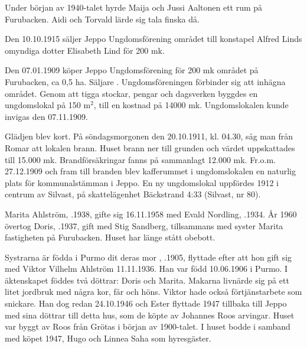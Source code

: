Under början av 1940-talet hyrde Maija och Jussi Aaltonen ett rum på Furubacken. Aidi och Torvald lärde sig tala finska då.



Den 10.10.1915 säljer Jeppo Ungdomsförening området till konstapel Alfred Linds omyndiga dotter  Elisabeth Lind för 200 mk.


Den 07.01.1909 köper Jeppo Ungdomsförening för 200 mk området på Furubacken, ca 0,5 ha. Säljare . Ungdomsföreningen förbinder sig att inhägna området. Genom att tigga stockar, pengar och dagsverken byggdes en ungdomslokal på 150 m$^2$, till en kostnad på 14000 mk. Ungdomslokalen kunde invigas den 07.11.1909.

Glädjen blev kort. På söndagsmorgonen den 20.10.1911, kl. 04.30, såg man från Romar att lokalen brann. Huset brann ner till grunden och värdet uppskattades till 15.000 mk. Brandförsäkringar fanns på sammanlagt 12.000 mk. Fr.o.m. 27.12.1909 och fram till branden blev kafferummet i ungdomslokalen en naturlig plats för kommunalstämman i Jeppo. En ny ungdomslokal uppfördes 1912 i centrum av Silvast, på skattelägenhet Bäckstrand 4:33 (Silvast, nr 80).





Marita Ahlström, .1938, gifte sig 16.11.1958 med Evald Nordling, .1934. År 1960 övertog Doris, .1937, gift med Stig Sandberg, tillsammans med syster Marita fastigheten på Furubacken. Huset har länge stått obebott.

Systrarna är födda i Purmo dit deras mor , .1905, flyttade efter att hon gift sig med Viktor Vilhelm Ahlström 11.11.1936. Han var född 10.06.1906 i Purmo. I äktenskapet föddes två  döttrar: Doris och Marita. Makarna livnärde sig på ett litet jordbruk med några kor, får och höns. Viktor hade också förtjänstarbete som snickare. Han dog redan 24.10.1946 och Ester flyttade 1947 tillbaka till Jeppo med sina döttrar till detta hus, som de köpte av Johannes Roos arvingar. Huset var byggt av Roos från Grötas i början av 1900-talet. I huset bodde i samband med köpet 1947, Hugo och Linnea Saha som hyresgäster.

